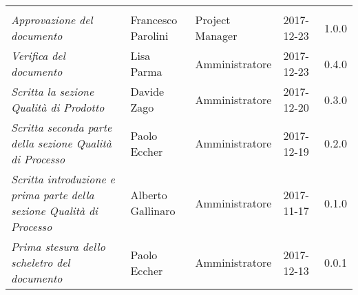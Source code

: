 \newpage 
\section*{}
\begin{table}[H]
	\centering
	\begin{tabular}{p{4cm}|C{3cm}|C{3cm}|R{2.5cm}|R{2cm}}
		
		 & & & & \\
		
		
		\emph{Approvazione del documento}& Francesco Parolini & Project Manager & 2017-12-23 & 1.0.0 \\
		\hline
		
		\emph{Verifica del documento}& Lisa Parma & Amministratore & 2017-12-23 & 0.4.0 \\
		\hline
		
		\emph{Scritta la sezione Qualità di Prodotto}& Davide Zago & Amministratore & 2017-12-20 & 0.3.0 \\
		\hline
		
		\emph{Scritta seconda parte della sezione Qualità di Processo}& Paolo Eccher & Amministratore & 2017-12-19 & 0.2.0 \\
		\hline
		
		\emph{Scritta introduzione e prima parte della sezione Qualità di Processo} & Alberto Gallinaro & Amministratore & 2017-11-17 & 0.1.0 \\
		\hline
		
		\emph{Prima stesura dello scheletro del documento} & Paolo Eccher & Amministratore & 2017-12-13 & 0.0.1 \\
		
	\end{tabular}
	
\end{table}


\clearpage